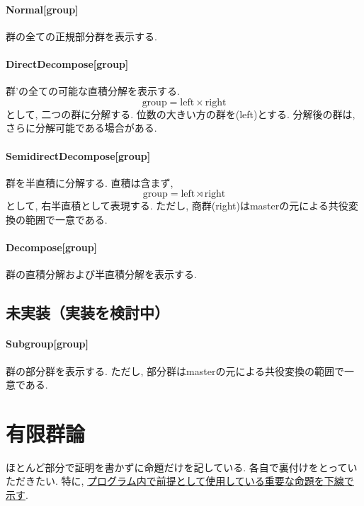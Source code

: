 \documentclass[11pt, a4paper]{jsarticle}
\begin{document}
\paragraph{Normal[group]}
群の全ての正規部分群を表示する.

\paragraph{DirectDecompose[group]}
群'の全ての可能な直積分解を表示する.
\begin{equation}
\text{group} = \text{left} \times \text{right}
\end{equation}
として, 二つの群に分解する.
位数の大きい方の群を(left)とする.
分解後の群は, さらに分解可能である場合がある.

\paragraph{SemidirectDecompose[group]}
群を半直積に分解する.
直積は含まず,
\begin{equation}
\text{group} = \text{left} \rtimes \text{right}
\end{equation}
として, 右半直積として表現する.
ただし, 商群(right)はmasterの元による共役変換の範囲で一意である.

\paragraph{Decompose[group]}
群の直積分解および半直積分解を表示する.

\subsection{未実装（実装を検討中）}

\paragraph{Subgroup[group]}
群の部分群を表示する.
ただし, 部分群はmasterの元による共役変換の範囲で一意である.

\newpage
\section{有限群論}
ほとんど部分で証明を書かずに命題だけを記している.
各自で裏付けをとっていただきたい.
特に, \uline{プログラム内で前提として使用している重要な命題を下線で示す}.
\end{document}
